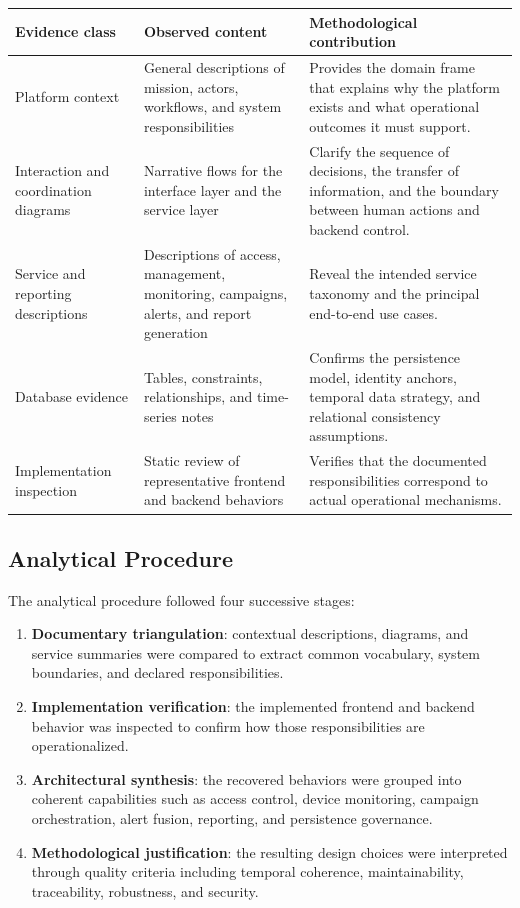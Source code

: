 \documentclass[11pt,a4paper]{article}
\begin{document}
\begin{longtable}{@{}p{}p{}p{}@{}}
\toprule
\textbf{Evidence class} & \textbf{Observed content} & \textbf{Methodological contribution} \\
\midrule
\endhead
Platform context & General descriptions of mission, actors, workflows, and system responsibilities & Provides the domain frame that explains why the platform exists and what operational outcomes it must support. \\
Interaction and coordination diagrams & Narrative flows for the interface layer and the service layer & Clarify the sequence of decisions, the transfer of information, and the boundary between human actions and backend control. \\
Service and reporting descriptions & Descriptions of access, management, monitoring, campaigns, alerts, and report generation & Reveal the intended service taxonomy and the principal end-to-end use cases. \\
Database evidence & Tables, constraints, relationships, and time-series notes & Confirms the persistence model, identity anchors, temporal data strategy, and relational consistency assumptions. \\
Implementation inspection & Static review of representative frontend and backend behaviors & Verifies that the documented responsibilities correspond to actual operational mechanisms. \\
\bottomrule
\end{longtable}

\subsection{Analytical Procedure}
The analytical procedure followed four successive stages:

\begin{enumerate}
  \item \textbf{Documentary triangulation}: contextual descriptions, diagrams, and service summaries were compared to extract common vocabulary, system boundaries, and declared responsibilities.
  \item \textbf{Implementation verification}: the implemented frontend and backend behavior was inspected to confirm how those responsibilities are operationalized.
  \item \textbf{Architectural synthesis}: the recovered behaviors were grouped into coherent capabilities such as access control, device monitoring, campaign orchestration, alert fusion, reporting, and persistence governance.
  \item \textbf{Methodological justification}: the resulting design choices were interpreted through quality criteria including temporal coherence, maintainability, traceability, robustness, and security.
\end{enumerate}
\end{document}
